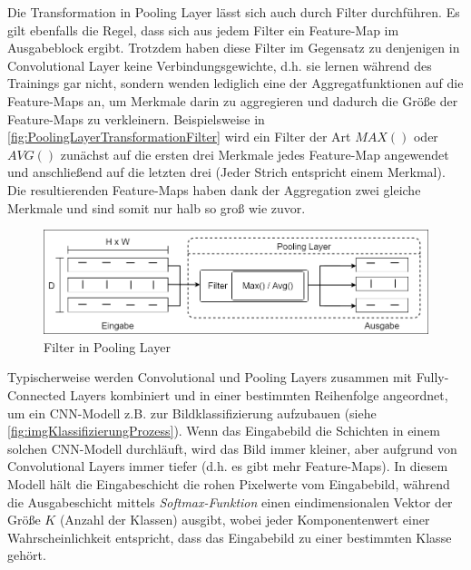 Die Transformation in Pooling Layer lässt sich auch durch Filter durchführen. Es gilt ebenfalls die Regel, dass sich aus jedem Filter ein Feature-Map im Ausgabeblock ergibt. Trotzdem haben diese Filter im Gegensatz zu denjenigen in Convolutional Layer keine Verbindungsgewichte, d.h. sie lernen während des Trainings gar nicht, sondern wenden lediglich eine der Aggregatfunktionen auf die Feature-Maps an, um Merkmale darin zu aggregieren und dadurch die Größe der Feature-Maps zu verkleinern. Beispielsweise in \autoref{fig:PoolingLayerTransformationFilter} wird ein Filter der Art $MAX()$ oder $AVG()$ zunächst auf die ersten drei Merkmale jedes Feature-Map angewendet und anschließend auf die letzten drei (Jeder Strich entspricht einem Merkmal). Die resultierenden Feature-Maps haben dank der Aggregation zwei gleiche Merkmale und sind somit nur halb so groß wie zuvor.

\begin{figure}[!hb]
	\centering
	\includegraphics[width=\linewidth]{images/PoolingLayerTransformationFilter}
	\caption{Filter in Pooling Layer}
	\label{fig:PoolingLayerTransformationFilter}
\end{figure}

Typischerweise werden Convolutional und Pooling Layers zusammen mit Fully-Connected Layers kombiniert und in einer bestimmten Reihenfolge angeordnet, um ein CNN-Modell z.B. zur Bildklassifizierung aufzubauen (siehe \autoref{fig:imgKlassifizierungProzess}). Wenn das Eingabebild die Schichten in einem solchen CNN-Modell durchläuft, wird das Bild immer kleiner, aber aufgrund von Convolutional Layers immer tiefer (d.h. es gibt mehr Feature-Maps). In diesem Modell hält die Eingabeschicht die rohen Pixelwerte vom Eingabebild, während die Ausgabeschicht mittels \emph{Softmax-Funktion} einen eindimensionalen Vektor der Größe $K$ (Anzahl der Klassen) ausgibt, wobei jeder Komponentenwert einer Wahrscheinlichkeit entspricht, dass das Eingabebild zu einer bestimmten Klasse gehört. 

